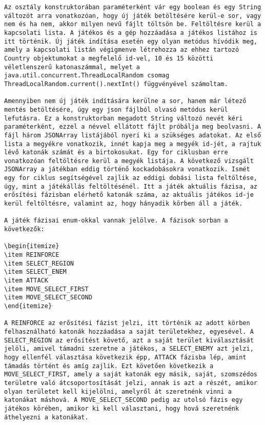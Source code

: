 \begin{verbatim}
Az osztály konstruktorában paraméterként vár egy boolean és egy String változót arra vonatkozóan, hogy új játék betöltésére kerül-e sor, vagy nem és ha nem, akkor milyen nevű fájlt töltsön be. Feltöltésre kerül a kapcsolati lista. A játékos és a gép hozzáadása a játékos listához is itt történik. Új játék indítása esetén egy olyan metódus hívódik meg, amely a kapcsolati listán végigmenve létrehozza az ehhez tartozó Country objektumokat a megfelelő id-vel, 10 és 15 közötti véletlenszerű katonaszámmal, melyet a java.util.concurrent.ThreadLocalRandom csomag ThreadLocalRandom.current().nextInt() függvényével számoltam. 

Amennyiben nem új játék indítására kerülne a sor, hanem már létező mentés betöltésére, úgy egy json fájlból olvasó metódus kerül lefutásra. Ez a konstruktorban megadott String változó nevét kéri paraméterként, ezzel a névvel ellátott fájlt próbálja meg beolvasni. A fájl három JSONArray listájából nyeri ki a szükséges adatokat. Az első lista a megyékre vonatkozik, innét kapja meg a megyék id-jét, a rajtuk lévő katonák számát és a birtokosukat. Egy for ciklusban erre vonatkozóan feltöltésre kerül a megyék listája. A következő vizsgált JSONArray a játékban eddig történő kockadobásokra vonatkozik. Ismét egy for ciklus segítségével zajlik az eddigi dobási lista feltöltése, úgy, mint a játékállás feltöltésénél. Itt a játék aktuális fázisa, az erősítési fázisban elérhető katonák száma, az aktuális játékos id-je kerül feltöltésre, valamint az, hogy hányadik körben áll a játék. 

A játék fázisai enum-okkal vannak jelölve. A fázisok sorban a következők: 

\begin{itemize}
\item REINFORCE 
\item SELECT_REGION 
\item SELECT_ENEM 
\item ATTACK 
\item MOVE_SELECT_FIRST 
\item MOVE_SELECT_SECOND
\end{itemize}

A REINFORCE az erősítési fázist jelzi, itt történik az adott körben felhasználható katonák hozzáadása a saját területekhez, egyesével. A SELECT_REGION az erősítést követő, azt a saját terület kiválasztását jelöli, amivel támadni szeretne a játékos, a SELECT_ENEMY azt jelzi, hogy ellenfél választása következik épp, ATTACK fázisba lép, amint támadás történt és amíg zajlik. Ezt követően következik a MOVE_SELECT_FIRST, amely a saját katonák egy másik, saját, szomszédos területre való átcsoportosítását jelzi, annak is azt a részét, amikor olyan területet kell kijelölni, amelyről át szeretnénk vinni a katonákat máshová. A MOVE_SELECT_SECOND pedig az utolsó fázis egy játékos körében, amikor ki kell választani, hogy hová szeretnénk áthelyezni a katonákat. 


\end{verbatim}
